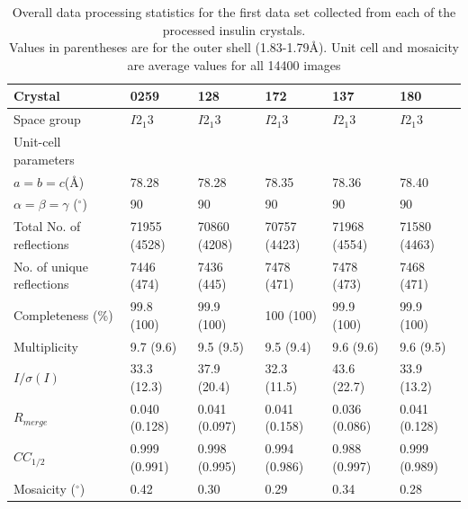 \begin{table}[ht!]
\centering
\captionsetup{justification=centering}
	\caption[Data processing statistics for the first data set collected from each of the processed insulin crystals.]{Overall data processing statistics for the first data set collected from each of the processed insulin crystals.
	\\[1pt]
	Values in parentheses are for the outer shell (1.83-1.79\AA). Unit cell and mosaicity are average values for all 14400 images}
	\centering
	\begin{tabular}{p{3.5cm} p{2cm} p{2cm} p{2cm} p{2cm} p{2cm}}
		\hline
		Crystal  																	&0259				   &128						&172					 &137						&180						\\
		\hline
		Space group   														&$I$2$_{\text{1}}$3	 &$I$2$_{\text{1}}$3		&$I$2$_{\text{1}}$3	   &$I$2$_{\text{1}}$3			&$I$2$_{\text{1}}$3 		\\
		Unit-cell parameters  										& 						 &    					&   					 &   						&  						 	\\
		$a = b = c$(\AA)  																&78.28				 &78.28					&78.35				 &78.36 				&78.40					\\
		$\alpha = \beta = \gamma$ ($^{\circ}$) 		&90					   &90 						&90						 &90					 	&90							\\
		Total No. of reflections									&71955 (4528)  &70860 (4208)	&70757 (4423)	 &71968 (4554)	&71580 (4463)		\\
		No. of unique reflections									&7446 (474)	   &7436 (445)		&7478 (471)		 &7478 (473)		&7468 (471)			\\
		Completeness (\%) 											&99.8 (100)	   &99.9 (100)		&100 (100)		 &99.9 (100)		&99.9 (100) 		\\
		Multiplicity															&9.7 (9.6)		 &9.5 (9.5)			&9.5 (9.4)		 &9.6 (9.6)		  &9.6 (9.5)			\\
		$I/\sigma (I)$												 		&33.3 (12.3)	 &37.9 (20.4)		&32.3	 (11.5)	 &43.6 (22.7)	  &33.9 (13.2)  	\\
		$R_{merge}$													&0.040 (0.128) &0.041 (0.097) &0.041 (0.158) &0.036 (0.086) &0.041 (0.128)  \\
		$CC_{1/2}$																&0.999 (0.991) &0.998 (0.995) &0.994 (0.986) &0.988 (0.997) &0.999 (0.989)	\\
		Mosaicity ($^{\circ}$)										&0.42				   &0.30					&0.29					 &0.34					&0.28						\\
		\hline
	\end{tabular}
	\label{tab: Hamburg data processing}
\end{table}

